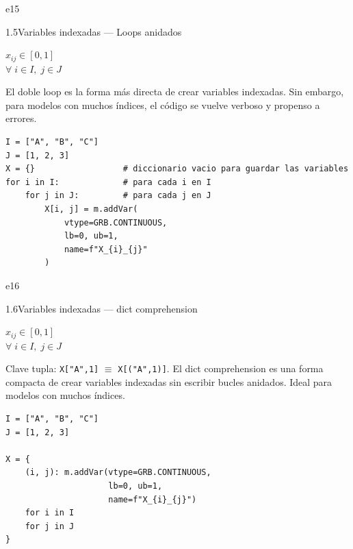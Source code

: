 \documentclass[10pt,a4paper]{article}
\newlength{\mathcolw}
\newlength{\codecolw}
\newcommand{\entryheader}[2][]{%
  \needspace{5cm}%
  \vspace{6pt}%
  \ifx\relax#1\relax\else\phantomsection\hypertarget{#1}{}\fi%
  \noindent%
  \begin{tcolorbox}[
    colback=subsecbg!18,
    colframe=subsecbg!45,
    sharp corners, boxrule=0.4pt,
    left=5pt, right=5pt, top=2pt, bottom=2pt,
    fontupper=\small\bfseries\sffamily,
  ]
  #2
  \end{tcolorbox}%
  \vspace{2pt}%
}
\newcommand{\py}[1]{\texttt{\small #1}}
\begin{document}
\entryheader[e15]{1.5\quad Variables indexadas --- Loops anidados}
\noindent
\begin{minipage}[t]{\mathcolw}
    \begin{tcolorbox}[mathbox]
        $x_{ij} \in [0,1]$\\[4pt]
        $\forall\; i \in I,\; j \in J$
    \end{tcolorbox}
    \vspace{2pt}
    \begin{tcolorbox}[notebox]
        El doble loop es la forma m\'as directa de crear variables indexadas. Sin embargo, para modelos con muchos \'indices, el c\'odigo se vuelve verboso y propenso a errores.
    \end{tcolorbox}
\end{minipage}\hspace{0.02\textwidth}%
\begin{minipage}[t]{\codecolw}
    \begin{lstlisting}[style=gurobipy]
I = ["A", "B", "C"]
J = [1, 2, 3]
X = {}                  # diccionario vacio para guardar las variables
for i in I:             # para cada i en I
    for j in J:         # para cada j en J
        X[i, j] = m.addVar(
            vtype=GRB.CONTINUOUS,
            lb=0, ub=1,
            name=f"X_{i}_{j}"
        )
\end{lstlisting}
\end{minipage}

\vspace{4pt}

\entryheader[e16]{1.6\quad Variables indexadas --- dict comprehension}
\noindent
\begin{minipage}[t]{\mathcolw}
    \begin{tcolorbox}[mathbox]
        $x_{ij} \in [0,1]$\\[4pt]
        $\forall\; i \in I,\; j \in J$
    \end{tcolorbox}
    \vspace{2pt}
    \begin{tcolorbox}[notebox]
        Clave tupla: \py{X["A",1]} $\equiv$ \py{X[("A",1)]}. El dict comprehension es una forma compacta de crear variables indexadas sin escribir bucles anidados. Ideal para modelos con muchos índices.
    \end{tcolorbox}
\end{minipage}\hspace{0.02\textwidth}%
\begin{minipage}[t]{\codecolw}
    \begin{lstlisting}[style=gurobipy]
I = ["A", "B", "C"]
J = [1, 2, 3]

X = {
    (i, j): m.addVar(vtype=GRB.CONTINUOUS,
                     lb=0, ub=1,
                     name=f"X_{i}_{j}")
    for i in I
    for j in J
}
\end{lstlisting}
\end{minipage}
\end{document}
